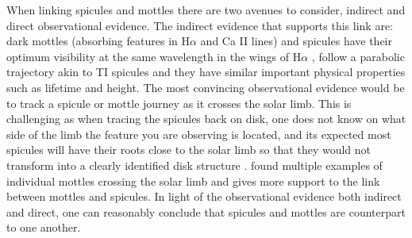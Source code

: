 \documentclass[12pt]{ociamthesis}
\begin{document}
%
When linking spicules and mottles there are two avenues to consider, indirect and direct observational evidence. The indirect evidence that supports this link are: dark mottles (absorbing features in H$\alpha$ and Ca II lines) and spicules have their optimum visibility at the same wavelength in the wings of H$\alpha$ \citep{Tsiropoula1993A}, follow a parabolic trajectory akin to TI spicules \citep{Rouppe2007ApJ660L169R} and they have similar important physical properties such as lifetime and height. The most convincing observational evidence would be to track a spicule or mottle journey as it crosses the solar limb. This is challenging as when tracing the spicules back on disk, one does not know on what side of the limb the feature you are observing is located, and its expected most spicules will have their roots close to the solar limb so that they would not transform into a clearly identified disk structure \citep{Beckers1968}. \cite{Christopoulou2001SoPh19961C} found multiple examples of individual mottles crossing the solar limb and gives more support to the link between mottles and spicules. In light of the observational evidence both indirect and direct, one can reasonably conclude that spicules and mottles are counterpart to one another.
\end{document}
